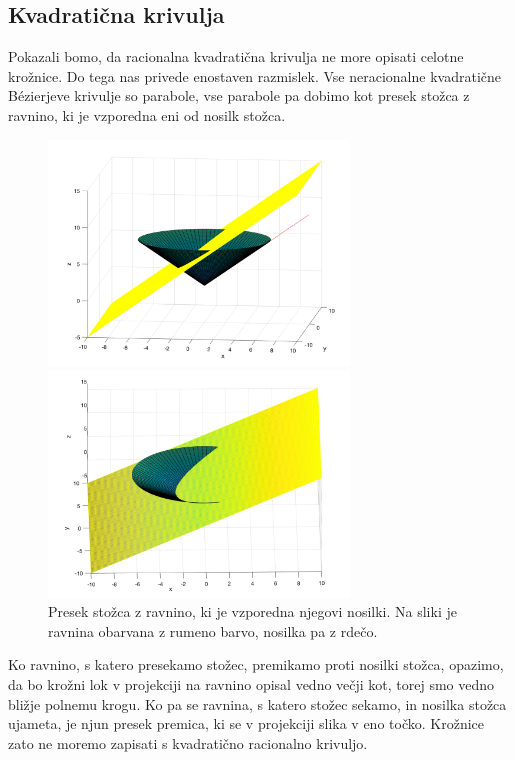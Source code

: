 \documentclass[a4paper,11pt]{article}
\theoremstyle{definition}
\theoremstyle{plain}
\begin{document}
\subsection{ Kvadratična krivulja}
Pokazali bomo, da racionalna kvadratična krivulja ne more opisati celotne krožnice. Do tega nas privede enostaven razmislek. 
Vse neracionalne kvadratične B\'ezierjeve krivulje so parabole, vse parabole pa dobimo kot presek stožca z ravnino, ki je vzporedna eni od nosilk stožca. 
\begin{figure}[ht!]
    \begin{minipage}{0.5\textwidth}
        \centering
        \includegraphics[width=80mm]{stozec_presek_1.png}
    \end{minipage}\hfill
    \begin{minipage}{0.5\textwidth}
        \centering
        \includegraphics[width=80mm]{stozec_presek_2.png}
    \end{minipage}\hfill
    \caption{Presek stožca z ravnino, ki je vzporedna njegovi nosilki. Na sliki je ravnina obarvana z rumeno barvo, nosilka pa z rdečo.}
\end{figure}

\noindent
Ko ravnino, s katero presekamo stožec, premikamo proti nosilki stožca, opazimo, da bo krožni lok v projekciji na ravnino opisal vedno večji kot, torej smo vedno bližje polnemu krogu. 
Ko pa se ravnina, s katero stožec sekamo, in nosilka stožca ujameta, je njun presek premica, ki se v projekciji slika v eno točko. 
Krožnice zato ne moremo zapisati s kvadratično racionalno krivuljo. 
\end{document}
